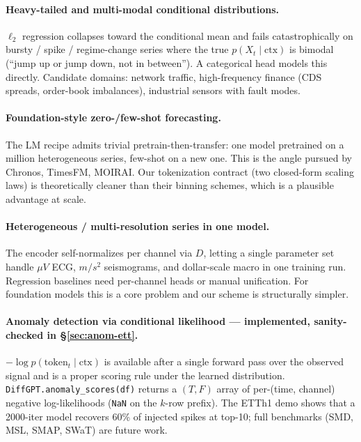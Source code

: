 \documentclass[11pt]{article}
\theoremstyle{remark}
\begin{document}
\paragraph{Heavy-tailed and multi-modal conditional distributions.}
$\ell_2$ regression collapses toward the conditional mean and fails
catastrophically on bursty / spike / regime-change series where the
true $p(X_t \mid \mathrm{ctx})$ is bimodal (``jump up or jump down,
not in between''). A categorical head models this directly. Candidate
domains: network traffic, high-frequency finance (CDS spreads,
order-book imbalances), industrial sensors with fault modes.

\paragraph{Foundation-style zero-/few-shot forecasting.}
The LM recipe admits trivial pretrain-then-transfer: one model
pretrained on a million heterogeneous series, few-shot on a new one.
This is the angle pursued by Chronos, TimesFM, MOIRAI. Our
tokenization contract (two closed-form scaling laws) is theoretically
cleaner than their binning schemes, which is a plausible advantage at
scale.

\paragraph{Heterogeneous / multi-resolution series in one model.}
The encoder self-normalizes per channel via $D$, letting a single
parameter set handle $\mu V$ ECG, $m/s^2$ seismograms, and dollar-scale
macro in one training run. Regression baselines need per-channel heads
or manual unification. For foundation models this is a core problem
and our scheme is structurally simpler.

\paragraph{Anomaly detection via conditional likelihood ---
implemented, sanity-checked in \S\ref{sec:anom-ett}.}
$-\log p(\text{token}_t \mid \mathrm{ctx})$ is available after a single
forward pass over the observed signal and is a proper scoring rule
under the learned distribution. \texttt{DiffGPT.anomaly\_scores(df)}
returns a $(T, F)$ array of per-(time, channel) negative log-likelihoods
(\texttt{NaN} on the $k$-row prefix). The ETTh1 demo shows that a
2000-iter model recovers 60\% of injected spikes at top-10; full
benchmarks (SMD, MSL, SMAP, SWaT) are future work.
\end{document}
